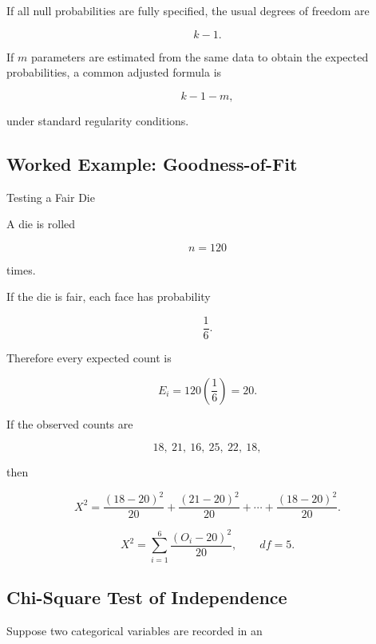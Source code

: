 If all null probabilities are fully specified, the usual degrees of
freedom are

\[
\boxed{
k-1.
}
\]

If \(m\) parameters are estimated from the same data to obtain the
expected probabilities, a common adjusted formula is

\[
\boxed{
k-1-m,
}
\]

under standard regularity conditions.

\subsection{Worked Example: Goodness-of-Fit}
\label{subsec:worked-goodness-of-fit}

\begin{workedexamplebox}{Testing a Fair Die}

A die is rolled

\[
n=120
\]

times.

If the die is fair, each face has probability

\[
\frac16.
\]

Therefore every expected count is

\[
E_i
=
120
\left(
\frac16
\right)
=
20.
\]

If the observed counts are

\[
18,\ 21,\ 16,\ 25,\ 22,\ 18,
\]

then

\[
X^2
=
\frac{(18-20)^2}{20}
+
\frac{(21-20)^2}{20}
+
\cdots
+
\frac{(18-20)^2}{20}.
\]

\begin{answerbox}
\[
\boxed{
X^2
=
\sum_{i=1}^{6}
\frac{
(O_i-20)^2
}{
20
},
\qquad
df=5.
}
\]
\end{answerbox}

\end{workedexamplebox}

\subsection{Chi-Square Test of Independence}
\label{subsec:chi-square-independence}

Suppose two categorical variables are recorded in an

